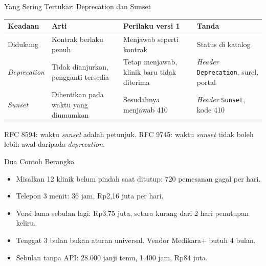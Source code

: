 \documentclass[aspectratio=169, table, 12pt]{beamer}
\begin{document}
\begin{frame}{{\Large Yang Sering Tertukar: Deprecation dan Sunset}}
  \footnotesize
  \begin{tabularx}{\textwidth}{>{\raggedright\arraybackslash}p{2.1cm} >{\raggedright\arraybackslash}X >{\raggedright\arraybackslash}X >{\raggedright\arraybackslash}p{3.2cm}}
    \hline
    \textbf{Keadaan} & \textbf{Arti} & \textbf{Perilaku versi 1} & \textbf{Tanda} \\ \hline
    Didukung & Kontrak berlaku penuh & Menjawab seperti kontrak & Status di katalog \\ \hline
    \textit{Deprecation} & Tidak dianjurkan, pengganti tersedia & Tetap menjawab, klinik baru tidak diterima & \textit{Header} \texttt{Deprecation}, surel, portal \\ \hline
    \textit{Sunset} & Dihentikan pada waktu yang diumumkan & Sesudahnya menjawab 410 & \textit{Header} \texttt{Sunset}, kode 410 \\ \hline
  \end{tabularx}

  \vspace{8pt}
  \small RFC 8594: waktu \textit{sunset} adalah petunjuk. RFC 9745: waktu \textit{sunset} tidak boleh lebih awal daripada \textit{deprecation}.
\end{frame}

\begin{frame}{{\Large Dua Contoh Berangka}}
  \vspace{8pt}
  \begin{itemize}
    \item Misalkan 12 klinik belum pindah saat ditutup: 720 pemesanan gagal per hari.
    \item Telepon 3 menit: 36 jam, Rp2,16 juta per hari.
    \item Versi lama sebulan lagi: Rp3,75 juta, setara kurang dari 2 hari penutupan keliru.
    \item Tenggat 3 bulan bukan aturan universal. Vendor Medikara+ butuh 4 bulan.
    \item Sebulan tanpa API: 28.000 janji temu, 1.400 jam, Rp84 juta.
  \end{itemize}
\end{frame}
\end{document}
